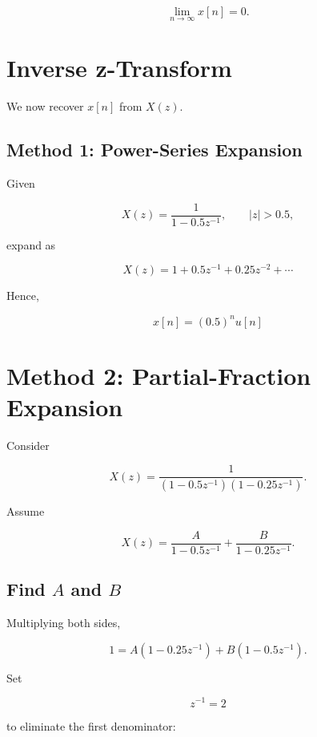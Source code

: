 \[
\lim_{n\to\infty}x[n]=0.
\]


\section{Inverse z-Transform}

We now recover \(x[n]\) from \(X(z)\).


\subsection{Method 1: Power-Series Expansion}

Given

\[
X(z)=
\frac{1}{1-0.5z^{-1}},
\qquad |z|>0.5,
\]

expand as

\[
X(z)=
1+0.5z^{-1}+0.25z^{-2}+\cdots
\]

Hence,

\[
\boxed{
x[n]=(0.5)^n u[n]
}
\]


\section{Method 2: Partial-Fraction Expansion}

Consider

\[
X(z)=
\frac{1}
{(1-0.5z^{-1})(1-0.25z^{-1})}.
\]

Assume

\[
X(z)=
\frac{A}{1-0.5z^{-1}}
+
\frac{B}{1-0.25z^{-1}}.
\]


\subsection{Find \(A\) and \(B\)}

Multiplying both sides,

\[
1=A(1-0.25z^{-1})+B(1-0.5z^{-1}).
\]

Set

\[
z^{-1}=2
\]

to eliminate the first denominator:

